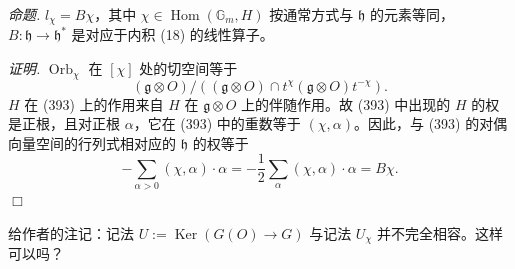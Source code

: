  \emph{命题.} $l_{\chi}=B\chi$，其中 $\chi\in\operatorname{Hom}(\mathbb{G}_{m},H)$ 按通常方式与 $\mathfrak{h}$ 的元素等同，$B:\mathfrak{h}\to\mathfrak{h}^{*}$ 是对应于内积 (18) 的线性算子。

\emph{证明.} $\operatorname{Orb}_{\chi}$ 在 $[\chi]$ 处的切空间等于
\begin{equation}\tag{393}
(\mathfrak{g}\otimes O)/((\mathfrak{g}\otimes O)\cap t^{\chi}(\mathfrak{g}\otimes O)t^{-\chi}).
\end{equation}
$H$ 在 (393) 上的作用来自 $H$ 在 $\mathfrak{g}\otimes O$ 上的伴随作用。故 (393) 中出现的 $H$ 的权是正根，且对正根 $\alpha$，它在 (393) 中的重数等于 $(\chi,\alpha)$。因此，与 (393) 的对偶向量空间的行列式相对应的 $\mathfrak{h}$ 的权等于
\[
-\sum_{\alpha>0}(\chi,\alpha)\cdot\alpha=-\frac{1}{2}\sum_{\alpha}(\chi,\alpha)\cdot\alpha=B\chi.
\]
\hfill$\Box$

给作者的注记：记法 $U:=\operatorname{Ker}(G(O)\to G)$ 与记法 $U_{\chi}$ 并不完全相容。这样可以吗？

